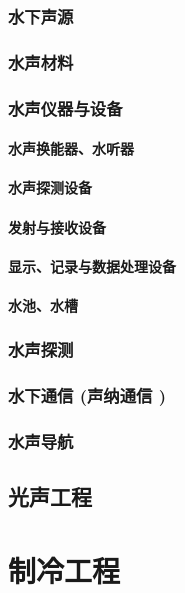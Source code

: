 \documentclass[UTF8]{../../ApplicationUniverse}
\begin{document}
    \subsection{水下声源}
    \subsection{水声材料}
    \subsection{水声仪器与设备}
        \subsubsection{水声换能器、水听器}
        \subsubsection{水声探测设备}
        \subsubsection{发射与接收设备}
        \subsubsection{显示、记录与数据处理设备}
        \subsubsection{水池、水槽}
    \subsection{水声探测}
    \subsection{水下通信 (声纳通信 )}
    \subsection{水声导航}
\section{光声工程}









\chapter{制冷工程}
\end{document}
